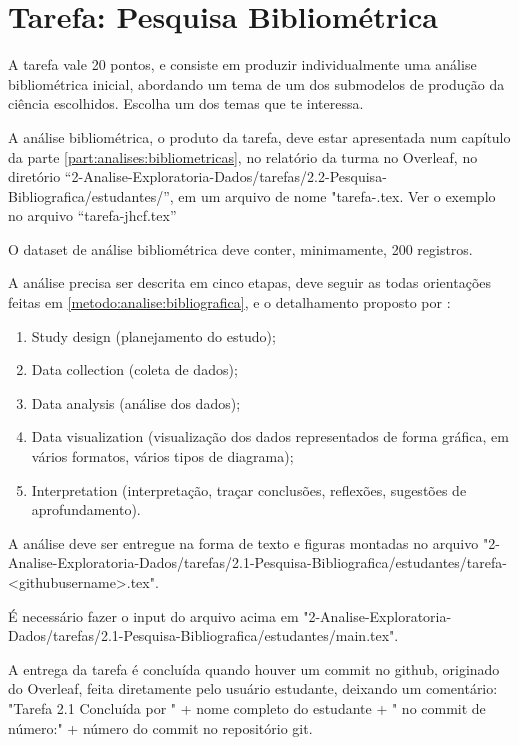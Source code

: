 \section{Tarefa: Pesquisa Bibliométrica}

A tarefa vale 20 pontos, e consiste em produzir individualmente uma análise bibliométrica inicial, abordando um tema de um dos submodelos de produção da ciência escolhidos. Escolha um dos temas que te interessa. 

A análise bibliométrica, o produto da tarefa, deve estar apresentada num capítulo da parte \ref{part:analises:bibliometricas}, no relatório da turma no Overleaf, no diretório ``2-Analise-Exploratoria-Dados/tarefas/2.2-Pesquisa-Bibliografica/estudantes/'', em um arquivo de nome "tarefa-\githubusername.tex. Ver o exemplo no arquivo ``tarefa-jhcf.tex''

O dataset de análise bibliométrica deve conter, minimamente, 200 registros.

A análise precisa ser descrita em cinco etapas, deve seguir as todas orientações feitas em \ref{metodo:analise:bibliografica}, e o detalhamento proposto por \citet{aria_bibliometrix_2017}:
\begin{enumerate}
    \item Study design (planejamento do estudo);

    \item  Data collection (coleta de dados);

    \item Data analysis (análise dos dados);

    \item Data visualization (visualização dos dados representados de forma gráfica, em vários formatos, vários tipos de diagrama);

    \item  Interpretation (interpretação, traçar conclusões, reflexões, sugestões de aprofundamento).
\end{enumerate}

A análise deve ser entregue na forma de texto e figuras montadas no arquivo "2-Analise-Exploratoria-Dados/tarefas/2.1-Pesquisa-Bibliografica/estudantes/tarefa-<githubusername>.tex".

É necessário fazer o input do arquivo acima em "2-Analise-Exploratoria-Dados/tarefas/2.1-Pesquisa-Bibliografica/estudantes/main.tex".

A entrega da tarefa é concluída quando houver um commit no github, originado do Overleaf, feita diretamente pelo usuário estudante, deixando um comentário: 
"Tarefa 2.1 Concluída por " + nome completo do estudante + " no commit de número:" + número do commit no repositório git.

